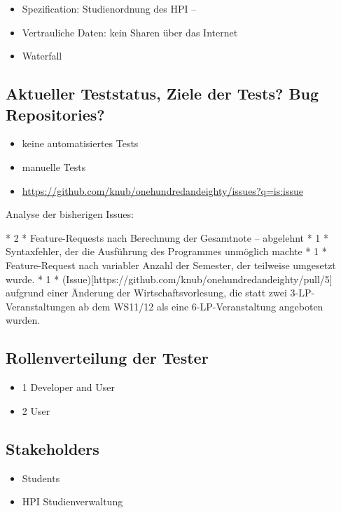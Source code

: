 \documentclass[ngerman]{article}
\begin{document}
\begin{itemize}
    \item
        Spezification: Studienordnung des HPI -- 
    \item
        Vertrauliche Daten: kein Sharen über das Internet
    \item
        Waterfall
\end{itemize}

\subsection{Aktueller Teststatus, Ziele der Tests? Bug Repositories?}

\begin{itemize}
    \item
        keine automatisiertes Tests
    \item
        manuelle Tests
    \item
        \url{https://github.com/knub/onehundredandeighty/issues?q=is:issue}
\end{itemize}

Analyse der bisherigen Issues:

* 2 * Feature-Requests nach Berechnung der Gesamtnote -- abgelehnt
* 1 * Syntaxfehler, der die Ausführung des Programmes unmöglich machte
* 1 * Feature-Request nach variabler Anzahl der Semester, der teilweise umgesetzt wurde.
* 1 * (Issue){[}https://github.com/knub/onehundredandeighty/pull/5{]} aufgrund
einer Änderung der Wirtschaftsvorlesung, die statt zwei
3-LP-Veranstaltungen ab dem WS11/12 als eine 6-LP-Veranstaltung
angeboten wurden.

\subsection{Rollenverteilung der Tester}

\begin{itemize}
    \item 1 Developer and User
    \item 2 User
\end{itemize}

\subsection{Stakeholders}

\begin{itemize}
    \item Students
    \item HPI Studienverwaltung
\end{itemize}
\end{document}
